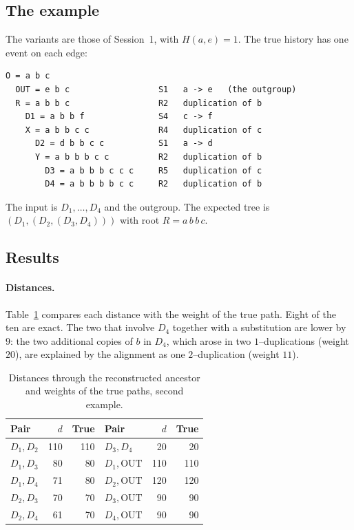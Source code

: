 \documentclass[11pt,a4paper]{article}
\begin{document}
\subsection{The example}
The variants are those of Session~1, with $H(a,e)=1$. The true history has one event on each
edge:
\begin{lstlisting}
O = a b c
  OUT = e b c                  S1   a -> e   (the outgroup)
  R = a b b c                  R2   duplication of b
    D1 = a b b f               S4   c -> f
    X = a b b c c              R4   duplication of c
      D2 = d b b c c           S1   a -> d
      Y = a b b b c c          R2   duplication of b
        D3 = a b b b c c c     R5   duplication of c
        D4 = a b b b b c c     R2   duplication of b
\end{lstlisting}
The input is $D_1,\ldots,D_4$ and the outgroup. The expected tree is $(D_1,(D_2,(D_3,D_4)))$
with root $R=a\,b\,b\,c$.

\subsection{Results}
\paragraph{Distances.} Table~\ref{tab:dist2} compares each distance with the weight of the true
path. Eight of the ten are exact. The two that involve $D_4$ together with a substitution are
lower by $9$: the two additional copies of $b$ in $D_4$, which arose in two $1$--duplications
(weight $20$), are explained by the alignment as one $2$--duplication (weight $11$).

\begin{table}[h]
\centering
\caption{Distances through the reconstructed ancestor and weights of the true paths, second
example.}
\label{tab:dist2}
\begin{tabular}{lrr@{\qquad}lrr}
\hline\hline
Pair & $d$ & True & Pair & $d$ & True \\ \hline
$D_1,D_2$ & 110 & 110 & $D_3,D_4$ & 20 & 20 \\
$D_1,D_3$ & 80 & 80 & $D_1,\mathrm{OUT}$ & 110 & 110 \\
$D_1,D_4$ & 71 & 80 & $D_2,\mathrm{OUT}$ & 120 & 120 \\
$D_2,D_3$ & 70 & 70 & $D_3,\mathrm{OUT}$ & 90 & 90 \\
$D_2,D_4$ & 61 & 70 & $D_4,\mathrm{OUT}$ & 90 & 90 \\ \hline\hline
\end{tabular}
\end{table}
\end{document}
